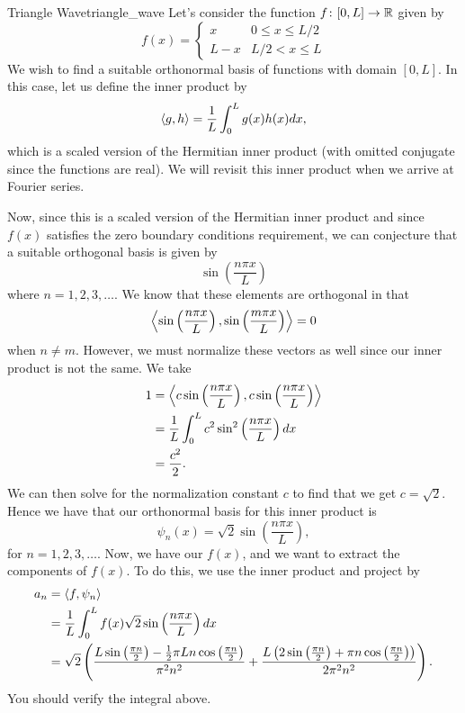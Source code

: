 \begin{ex}{Triangle Wave}{triangle_wave}
	Let's consider the function $f\colon [0,L]\to \mathbb{R}$ given by
	\[
		f(x)=\begin{cases} x & 0\leq x\leq L/2\\ L-x & L/2<x\leq L\end{cases}
	\]
	We wish to find a suitable orthonormal basis of functions with domain $[0,L]$.  In this case, let us define the inner product by
	\[
	\left\langle g, h \right\rangle = \frac{1}{L}\int_0^L g(x)h(x)dx,
	\]
	which is a scaled version of the Hermitian inner product (with omitted conjugate since the functions are real).  We will revisit this inner product when we arrive at Fourier series.  

	Now, since this is a scaled version of the Hermitian inner product and since $f(x)$ satisfies the zero boundary conditions requirement, we can conjecture that a suitable orthogonal basis is given by
	\[
		\sin\left( \frac{n\pi x}{L}\right)
	\]
	where $n=1,2,3,\dots$. We know that these elements are orthogonal in that
	\[
		\left\langle \sin\left( \frac{n\pi x}{L}\right), \sin\left( \frac{m\pi x}{L}\right) \right\rangle=0
	\]
	when $n\neq m$.  However, we must normalize these vectors as well since our inner product is not the same.  We take
	\begin{align*}
		1&=\left\langle c\sin\left( \frac{n\pi x}{L}\right), c\sin\left( \frac{n\pi x}{L}\right) \right\rangle\\
		&= \frac{1}{L} \int_0^L c^2 \sin^2\left(\frac{n\pi x}{L}\right)dx\\
		&= \frac{c^2}{2}.
	\end{align*}
	We can then solve for the normalization constant $c$ to find that we get $c=\sqrt{2}$.  Hence we have that our orthonormal basis for this inner product is
	\[
		\psi_n(x)= \sqrt{2} \sin \left(\frac{n \pi x}{L}\right),
	\]
	for $n=1,2,3,\dots$. Now, we have our $f(x)$, and we want to extract the components of $f(x)$.  To do this, we use the inner product and project by
	\begin{align*}
		a_n&=\left\langle f, \psi_n \right\rangle\\
			&= \frac{1}{L} \int_0^L f(x) \sqrt{2} \sin\left(\frac{n\pi x}{L}\right)dx\\
			&= \sqrt{2}\left(\frac{L\sin\left(\frac{\pi n}{2}\right)-\frac{1}{2}\pi Ln\cos\left(\frac{\pi n}{2}\right)}{\pi^{2}n^{2}}
+\frac{L\left(2\sin\left(\frac{\pi n}{2}\right)+\pi n\cos\left(\frac{\pi n}{2}\right)\right)}{2\pi^{2}n^{2}}\right).
	\end{align*}
	You should verify the integral above.


\end{ex}
